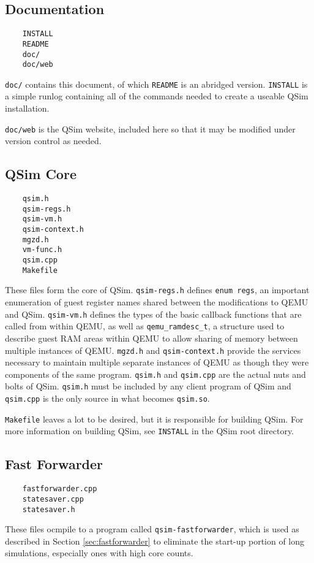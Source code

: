 \documentclass[letterpaper, 10pt]{book}
\begin{document}
\subsection{Documentation}

\begin{verbatim}
    INSTALL
    README
    doc/
    doc/web
\end{verbatim}
\texttt{doc/} contains this document, of which \texttt{README} is an abridged
version. \texttt{INSTALL} is a simple runlog containing all of the commands
needed to create a useable QSim installation.

\texttt{doc/web} is the QSim website, included here so that it may be modified
under version control as needed.

\subsection{QSim Core}

\begin{verbatim}
    qsim.h
    qsim-regs.h
    qsim-vm.h
    qsim-context.h
    mgzd.h
    vm-func.h
    qsim.cpp
    Makefile
\end{verbatim}
These files form the core of QSim. \texttt{qsim-regs.h} defines 
\texttt{enum regs}, an important enumeration of guest register names shared
between the modifications to QEMU and QSim. \texttt{qsim-vm.h} defines the
types of the basic callback functions that are called from within QEMU, as well
as \texttt{qemu\_ramdesc\_t}, a structure used to describe guest RAM areas
within QEMU to allow sharing of memory between multiple instances of QEMU.
\texttt{mgzd.h} and \texttt{qsim-context.h} provide the services necessary to
maintain multiple separate instances of QEMU as though they were components of
the same program. \texttt{qsim.h} and \texttt{qsim.cpp} are the actual nuts
and bolts of QSim. \texttt{qsim.h} must be included by any client program
of QSim and \texttt{qsim.cpp} is the only source in what becomes
\texttt{qsim.so}.

\texttt{Makefile} leaves a lot to be desired, but it is responsible for
building QSim. For more information on building QSim, see \texttt{INSTALL} in
the QSim root directory. 

\subsection{Fast Forwarder}
\begin{verbatim}
    fastforwarder.cpp
    statesaver.cpp
    statesaver.h
\end{verbatim}
These files ocmpile to a program called \texttt{qsim-fastforwarder}, which is 
used as described in Section \ref{sec:fastforwarder} to eliminate the start-up
portion of long simulations, especially ones with high core counts.
\end{document}
